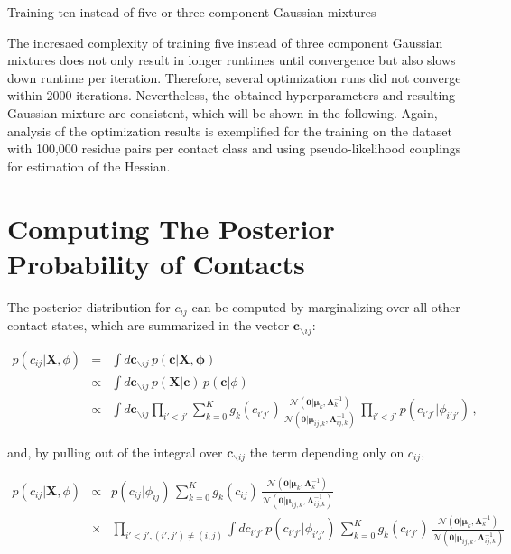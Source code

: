 \documentclass[11pt,a4paper,twoside]{book}
\newcommand{\Gauss}{\mathcal{N}}
\newcommand{\Lijk}{\mathbf{\Lambda}_{ij,k}}
\newcommand{\Lk}{\mathbf{\Lambda}_k}
\newcommand{\muijk}{\mathbf{\mu}_{ij,k}}
\newcommand{\muk}{\mathbf{\mu}_k}
\renewcommand{\c}{\mathbf{c}}
\newcommand{\cij}{c_{ij}}
\newcommand{\X}{\mathbf{X}}
\theoremstyle{definition}
\theoremstyle{definition}
\theoremstyle{remark}
\begin{document}
Training ten instead of five or three component Gaussian mixtures

The incresaed complexity of training five instead of three component
Gaussian mixtures does not only result in longer runtimes until
convergence but also slows down runtime per iteration. Therefore,
several optimization runs did not converge within 2000 iterations.
Nevertheless, the obtained hyperparameters and resulting Gaussian
mixture are consistent, which will be shown in the following. Again,
analysis of the optimization results is exemplified for the training on
the dataset with 100,000 residue pairs per contact class and using
pseudo-likelihood couplings for estimation of the Hessian.

\section{Computing The Posterior Probability of
Contacts}\label{posterior-of-rij}

The posterior distribution for \(c_{ij}\) can be computed by
marginalizing over all other contact states, which are summarized in the
vector \(\c_{\backslash ij}\):

\begin{eqnarray}
    p(\cij | \X, \phi) &=& \int d \c_{\backslash ij} \, p(\c |\X, \mathbf{\phi}) \nonumber\\
                &\propto & \int d \c_{\backslash ij} \, p(\X|\c) \, p(\c | \phi) \nonumber\\
                &\propto & \int d \c_{\backslash ij} \prod_{i'<j'} \sum_{k=0}^K g_{k}(c_{i'j'}) \, \frac{\Gauss( \mathbf{0} | \muk, \Lk^{-1})}{\Gauss(\mathbf{0} | \muijk, \Lijk^{-1})}
 \, \prod_{i'<j'} p(c_{i'j'} |\phi_{i'j'})  \,,
 \end{eqnarray}

and, by pulling out of the integral over \(\c_{\backslash ij}\) the term
depending only on \(\cij\),

\begin{eqnarray}
    p(\cij | \X, \phi) & \propto & 
            p(\cij |\phi_{ij}) \, \sum_{k=0}^K g_{k}(\cij) \, \frac{\Gauss( \mathbf{0} | \muk, \Lk^{-1})}{\Gauss(\mathbf{0} | \muijk, \Lijk^{-1})} \nonumber\\
            & \times  & \prod_{i'<j', (i',j') \ne (i,j)} \int d c_{i'j'} \, p(c_{i'j'} |\phi_{i'j'}) \, \sum_{k=0}^K g_{k}(c_{i'j'}) \, \frac{\Gauss( \mathbf{0} | \muk, \Lk^{-1})}{\Gauss(\mathbf{0} | \muijk, \Lijk^{-1})}
\end{eqnarray}
\end{document}
